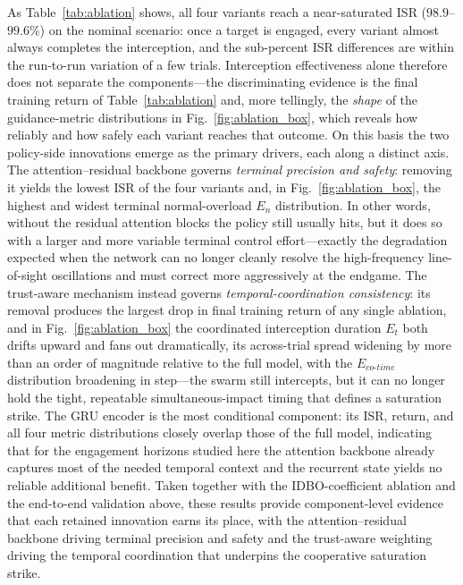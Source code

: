 \documentclass[lettersize,journal]{IEEEtran}
\newcommand{\hladd}[1]{{\color{blue}#1}}
\begin{document}
\hladd{As Table~\ref{tab:ablation} shows, all four variants reach a near-saturated ISR
($98.9$--$99.6\%$) on the nominal scenario: once a target is engaged, every variant almost always
completes the interception, and the sub-percent ISR differences are within the run-to-run variation of
a few trials. Interception effectiveness alone therefore does not separate the components---the
discriminating evidence is the final training return of Table~\ref{tab:ablation} and, more tellingly,
the \emph{shape} of the guidance-metric distributions in Fig.~\ref{fig:ablation_box}, which reveals how
reliably and how safely each variant reaches that outcome. On this basis the two policy-side
innovations emerge as the primary drivers, each along a distinct axis. The attention--residual backbone
governs \emph{terminal precision and safety}: removing it yields the lowest ISR of the four variants
and, in Fig.~\ref{fig:ablation_box}, the highest and widest terminal normal-overload $E_n$
distribution. In other words, without the residual
attention blocks the policy still usually hits, but it does so with a larger and more variable terminal
control effort---exactly the degradation expected when the network can no longer cleanly resolve the
high-frequency line-of-sight oscillations and must correct more aggressively at the endgame. The
trust-aware mechanism instead governs \emph{temporal-coordination consistency}: its removal produces
the largest drop in final training return of any single ablation, and in Fig.~\ref{fig:ablation_box}
the coordinated interception duration $E_t$ both drifts upward and fans out dramatically, its
across-trial spread widening by more than an order of magnitude relative to the full model, with the
$E_{co\text{-}time}$ distribution broadening in step---the swarm still intercepts, but it can no longer
hold the tight, repeatable simultaneous-impact timing that defines a saturation strike. The GRU encoder is the
most conditional component: its ISR, return, and all four metric distributions closely overlap those of
the full model, indicating that for the engagement horizons studied here the attention backbone already
captures most of the needed temporal context and the recurrent state yields no reliable additional
benefit. Taken together with the IDBO-coefficient ablation and the end-to-end validation above, these
results provide component-level evidence that each retained innovation earns its place, with the
attention--residual backbone driving terminal precision and safety and the trust-aware weighting
driving the temporal coordination that underpins the cooperative saturation strike.}
\end{document}
